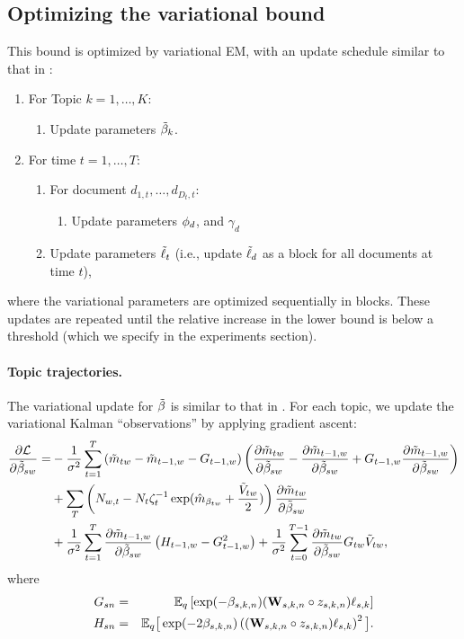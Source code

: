 \subsection*{Optimizing the variational bound}
This bound is optimized by variational EM, with an update schedule similar to that in \cite{blei:2006}:
\begin{enumerate}
\item For Topic $k=1, \ldots, K$:
  \begin{enumerate}
  \item Update parameters $\tilde{\beta}_k$.
  \end{enumerate}
\item For time $t = 1, \ldots, T$:
  \begin{enumerate}
  \item For document $d_{1,t}, \ldots, d_{{D_t}, t}$:
    \begin{enumerate}
    \item Update parameters $\phi_d$, and $\gamma_d$
      \end{enumerate}
    \item Update parameters $\tilde{\ell}_t$ (i.e., update $\tilde{\ell}_d$ as a
      block for all documents at time $t$),
    \end{enumerate}
  \end{enumerate}    
where the variational parameters are optimized sequentially in
blocks.  These updates are repeated until the relative increase in
the lower bound is below a threshold (which we specify in the
experiments section).

\paragraph{Topic trajectories.}
The variational update for $\tilde{\beta}$ is similar to that in
\cite{blei:2006}. For each topic, we update the variational Kalman   %
``observations'' by applying gradient ascent:
\begin{align*}
\frac{\partial \mathcal{L}}{\partial \tilde{\beta}_{sw}} =
   & -  \frac{1}{\sigma^2} \sum_{t=1}^T
     \left( \tilde{m}_{tw} - \tilde{m}_{t-1,w} - G_{t-1,w} \right) 
      \left( \frac{\partial \tilde{m}_{tw}}{\partial \tilde{\beta}_{sw}}
     - \frac{\partial \tilde{m}_{t-1,w}}{\partial \tilde{\beta}_{sw}}
     + G_{t-1,w} \frac{\partial \tilde{m}_{t-1,w}}{\partial \tilde{\beta}_{sw}} \right) \\
   & +  \sum_T \left(
       N_{w,t} - N_{t} \zeta_t^{-1}
       \exp( \hat{m}_{\beta_{tw}} + \frac{\tilde{V}_{tw}}{2} ) \right)
       \frac{\partial \tilde{m}_{tw}}{\partial \tilde{\beta}_{sw}}  \\
    & +  \frac{1}{\sigma^2} \sum_{t=1}^T
         \frac{\partial \tilde{m}_{t-1,w}}{\partial \tilde{\beta}_{sw}}
         \left( H_{t-1,w} - G_{t-1,w}^2 \right) 
    +  \frac{1}{\sigma^2} \sum_{t=0}^{T-1}
         \frac{\partial \tilde{m}_{tw}}{\partial \tilde{\beta}_{sw}}
         G_{tw} \tilde{V}_{tw},
\end{align*}
where
\begin{eqnarray*}
 G_{sn} &=& \mathbb{E}_q\left[\exp(-\beta_{s,k,n} ) ( \textbf{W}_{s,k,n} \circ
  z_{s,k,n} ) \ell_{s,k}\right] \\
 H_{sn} &=& \mathbb{E}_q \big[ \exp(-2 \beta_{s,k,n}) \left( (\textbf{W}_{s,k,n} \circ z_{s,k,n} ) \ell_{s,k} \right)^2 \big].
\end{eqnarray*}

